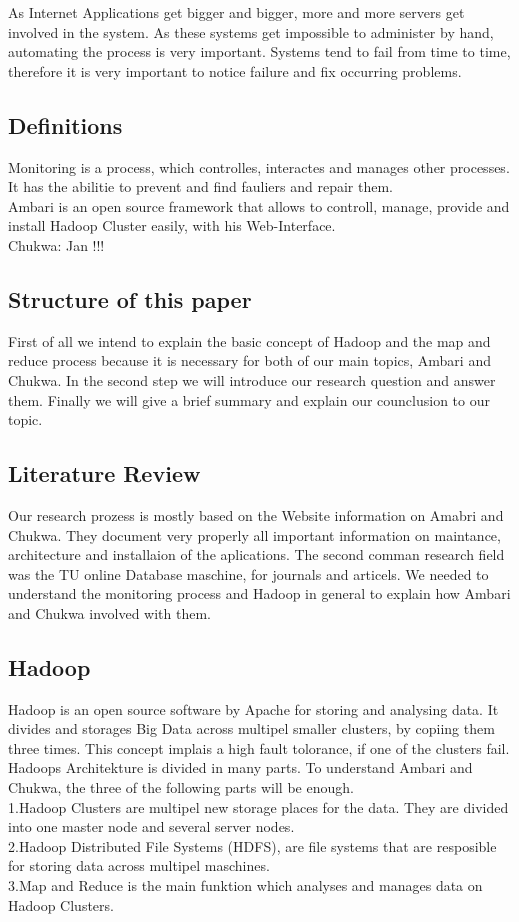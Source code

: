 As Internet Applications get bigger and bigger, more and more servers get involved in the system. As these systems get impossible to administer by hand, automating the process is very important. Systems tend to fail from time to time, therefore it is very important to notice failure and fix occurring problems.


\subsection{Definitions}
Monitoring is a process, which controlles, interactes and manages other processes. It has the abilitie to prevent and find fauliers and repair them.
\\
Ambari is an open source framework that allows to controll, manage, provide and install Hadoop Cluster easily, with his Web-Interface.
\\
Chukwa: Jan !!!

\subsection{Structure of this paper}
First of all we intend to explain the basic concept of Hadoop and the map and reduce process because it is necessary for both of our main topics, Ambari and Chukwa. In the second step we will introduce our research question and answer them. Finally we will give a brief summary and explain our counclusion to our  topic.

\subsection{Literature Review}
Our research prozess is mostly based on the Website information on Amabri and Chukwa. They document very properly all important information on maintance, architecture and installaion of the aplications. The second comman research field was the TU online Database maschine, for journals and articels. We needed to understand the monitoring process and Hadoop in general to explain how Ambari and Chukwa involved with them.
	
\subsection{Hadoop}
Hadoop is an open source software by Apache for storing and analysing data. It divides and storages Big Data across multipel smaller clusters, by copiing them three times. This concept implais a high fault tolorance, if one of the clusters fail.
 \\
 Hadoops Architekture is divided in many parts. To understand Ambari and Chukwa, the three of the following parts will be enough.
  \\
  1.Hadoop Clusters are multipel new storage places for the data. They are divided into one master node and several server nodes.
  \\
  2.Hadoop Distributed File Systems (HDFS), are file systems that are resposible for storing data across multipel maschines.
  \\
  3.Map and Reduce is the main funktion which analyses and manages data on Hadoop Clusters.
